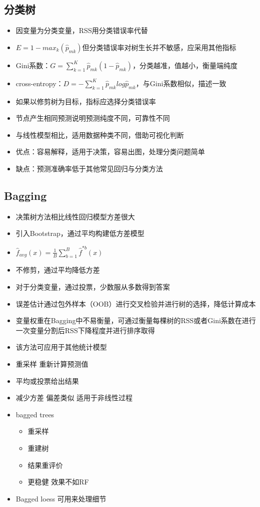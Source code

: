 \documentclass[]{book}
\providecommand{\tightlist}{%
  \setlength{\itemsep}{0pt}\setlength{\parskip}{0pt}}
\begin{document}
\subsection{分类树}

\begin{itemize}
\tightlist
\item
  因变量为分类变量，RSS用分类错误率代替
\item
  \(E = 1 - max_k(\hat p_{mk})\)但分类错误率对树生长并不敏感，应采用其他指标
\item
  Gini系数：\(G = \sum_{k = 1}^K\hat p_{mk}(1 - \hat p_{mk})\)，分类越准，值越小，衡量端纯度
\item
  cross-entropy：\(D = - \sum_{k = 1}^K\hat p_{mk} log\hat p_{mk}\)，与Gini系数相似，描述一致
\item
  如果以修剪树为目标，指标应选择分类错误率
\item
  节点产生相同预测说明预测纯度不同，可靠性不同
\item
  与线性模型相比，适用数据种类不同，借助可视化判断
\item
  优点：容易解释，适用于决策，容易出图，处理分类问题简单
\item
  缺点：预测准确率低于其他常见回归与分类方法
\end{itemize}

\hypertarget{bagging}{%
\subsection{Bagging}\label{bagging}}

\begin{itemize}
\item
  决策树方法相比线性回归模型方差很大
\item
  引入Bootstrap，通过平均构建低方差模型
\item
  \(\hat f_{avg}(x) = \frac{1}{B} \sum_{b = 1}^B \hat f^{*b}(x)\)
\item
  不修剪，通过平均降低方差
\item
  对于分类变量，通过投票，少数服从多数得到答案
\item
  误差估计通过包外样本（OOB）进行交叉检验并进行树的选择，降低计算成本
\item
  变量权重在Bagging中不易衡量，可通过衡量每棵树的RSS或者Gini系数在进行一次变量分割后RSS下降程度并进行排序取得
\item
  该方法可应用于其他统计模型
\item
  重采样 重新计算预测值
\item
  平均或投票给出结果
\item
  减少方差 偏差类似 适用于非线性过程
\item
  bagged trees

  \begin{itemize}
  \tightlist
  \item
    重采样
  \item
    重建树
  \item
    结果重评价
  \item
    更稳健 效果不如RF
  \end{itemize}
\item
  Bagged loess 可用来处理细节
\end{itemize}
\end{document}
